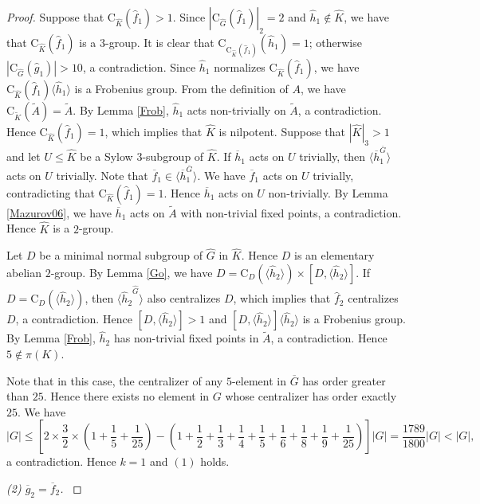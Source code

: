 \documentclass[11pt]{article}
\providecommand{\C}{{\mathrm{C}}}
\providecommand{\gen}[1]{\langle #1 \rangle} %
\providecommand{\gen}[1]{\langle #1 \rangle} %
\providecommand{\gen}[1]{\langle #1 \rangle} %
\providecommand{\olG}{{\overline{G}}}
\providecommand{\wtA}{{\widetilde{A}}}
\providecommand{\wtK}{{\widetilde{K}}}
\providecommand{\whf}{{\widehat{f}}}
\providecommand{\whh}{{\widehat{h}}}
\providecommand{\whG}{{\widehat{G}}}
\providecommand{\whK}{{\widehat{K}}}
\begin{document}
\begin{proof}
    Suppose that $\C_{\whK}(\widehat f_1)>1$.
    Since $|\C_{\whG}(\widehat f_1)|_2=2$ and $\widehat h_1 \notin \whK$, 
    we have that $\C_{\whK}(\widehat f_1)$ is a $3$-group.
    It is clear that $\C_{\C_{\whK}(\widehat f_1)}(\widehat h_1)=1$; 
    otherwise $|\C_{\whG}(\widehat g_1)|>10$, a contradiction.
    Since $\widehat h_1$ normalizes $\C_{\whK}(\widehat f_1)$, 
   we have $\C_{\whK}(\widehat f_1)\gen{\widehat h_1}$ is a Frobenius group.
    From the definition of $A$, we have $\C_{\wtK}(\wtA)=\wtA$.
    By Lemma \ref{Frob}, $\widehat h_1$ acts non-trivially on $\wtA$, a contradiction.
    Hence $\C_{\whK}(\widehat f_1)=1$, which implies that $\whK$ is nilpotent.
    Suppose that $|\whK|_3 >1$ and let $U\leq \whK$ be a Sylow $3$-subgroup of $\whK$.
    If $\overline h_1$ acts on $U$ trivially, then $\gen{\overline h_1^{\olG}}$ acts on $U$ trivially.
    Note that $\overline f_1\in \gen{\overline h_1^{\olG}}$.
    We have $\overline f_1$ acts on $U$ trivially, contradicting that $\C_{\whK}(\widehat f_1)=1$.
    Hence $\overline h_1$ acts on $U$ non-trivially.
    By Lemma \ref{Mazurov06}, we have $\overline h_1$ acts on $\wtA$ with non-trivial fixed points, a contradiction.
    Hence $\whK$ is a $2$-group.

    

    Let $D$ be a minimal normal subgroup of $\whG$ in $\whK$.
    Hence $D$ is an elementary abelian $2$-group.
    By Lemma \ref{Go}, we have $D=\C_D(\gen{\whh_2})\times [D, \gen{\whh_2}]$.
    If $D=\C_D(\gen{\whh_2})$, then $\gen{{\whh_2}^{\whG}}$ also centralizes $D$,
    which implies that $\whf_2$ centralizes $D$, a contradiction.
    Hence $[D,\gen{\whh_2}]>1$ 
    and $[D,\gen{\whh_2}]\gen{\whh_2}$ is a Frobenius group.
    By Lemma \ref{Frob}, $\whh_2$ has non-trivial fixed points in $\wtA$, a contradiction.
    Hence $5\notin \pi(K)$.

    

    
    
    
    

    Note that in this case, 
    the centralizer of any $5$-element in $\olG$ has order greater than $25$. 
    Hence there exists no element in $G$ whose centralizer has order exactly $25$.
    We have 
    $$ |G| \leq [2\times \frac{3}{2}\times (1+\frac{1}{5}+\frac{1}{25}) 
    -  (1 + \frac{1}{2} + \frac{1}{3} + \frac{1}{4} + \frac{1}{5} + \frac{1}{6}+ \frac{1}{8} + \frac{1}{9} + \frac{1}{25})]|G|
    = \frac{1789}{1800} |G|< |G|,$$ 
    a contradiction.
    Hence $k=1$ and $(1)$ holds.

{\sl  (2) $\overline {g}_2=\overline f_2$. } 


\end{proof}
\end{document}
